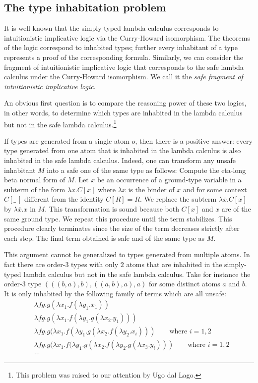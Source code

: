 \subsection*{The type inhabitation problem}

It is well known that the simply-typed lambda calculus corresponds
to intuitionistic implicative logic via the Curry-Howard
isomorphism. The theorems of the logic correspond to inhabited
types; further every inhabitant of a type represents a proof of the
corresponding formula. Similarly, we can consider the fragment of
intuitionistic implicative logic that corresponds to the safe lambda
calculus under the Curry-Howard isomorphism. We call it the
\emph{safe fragment of intuitionistic implicative logic}.

An obvious first question is to compare the reasoning power of these
two logics, in other words, to determine which types are inhabited
in the lambda calculus but not in the safe lambda
calculus.\footnote{This problem was raised to our attention by Ugo
dal Lago.}

If types are generated from a single atom $o$, then there is a
positive answer: every type generated from one atom that is
inhabited in the lambda calculus is also inhabited in the safe
lambda calculus. Indeed, one can transform any unsafe inhabitant $M$
into a safe one of the same type as follows: Compute the eta-long
beta normal form of $M$. Let $x$ be an occurrence of a ground-type
variable in a subterm of the form $\lambda \overline{x} . C[x]$
where $\lambda \overline{x}$ is the binder of $x$ and for some
context $C[\_~]$ different from the identity $C[R]=R$. We replace
the subterm $\lambda \overline{x} . C[x]$ by $\lambda \overline{x}.
x$ in $M$. This transformation is sound because both $C[x]$ and $x$
are of the same ground type. We repeat this procedure until the term
stabilizes. This procedure clearly terminates since the size of the
term decreases strictly after each step. The final term obtained is
safe and of the same type as $M$.

This argument cannot be generalized to types generated from multiple
atoms. In fact there are order-$3$ types with only $2$ atoms that
are inhabited in the simply-typed lambda calculus but not in the
safe lambda calculus. Take for instance the order-$3$ type
 $( ((b, a), b),  ((a, b), a),  a)$ for some distinct atoms $a$ and $b$. It is only inhabited by the following family of terms which are all unsafe:
 \begin{align*}
& \lambda f g . g (\lambda x_1 . f (\lambda y_1 . x_1)) \\
&\lambda f g . g (\lambda x_1 . f (\lambda y_1 . g (\lambda x_2 . y_1))) \\
&\lambda f g . g (\lambda x_1 . f (\lambda y_1 . g (\lambda x_2 . f (\lambda y_2 . x_i))) \qquad\mbox{where $i = 1, 2$} \\
&\lambda f g . g (\lambda x_1 . f (\lambda y_1 . g (\lambda x_2 . f (\lambda y_2 . g (\lambda x_3 . y_i))) \qquad\mbox{where $i = 1, 2$} \\
&\ldots
\end{align*}

